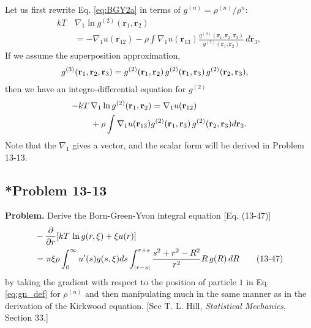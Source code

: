 \documentclass[twocolumn, 10pt]{article}
\numberwithin{equation}{section}
\newenvironment{problem}
{\par\medskip \color{problue}
  \textbf{Problem. }\ignorespaces}
{\medskip}
\newenvironment{solution}[1][\empty]
{\par\medskip\sffamily
  \textbf{\ifx\empty#1{Solution.}\relax\else{#1}\fi} \ignorespaces}
{\medskip}
\begin{document}
\begin{solution}
Let us first rewrite
Eq. \eqref{eq:BGY2a}
in terms of $g^{(n)} = \rho^{(n)}/\rho^n$:
\begin{align*}
kT \, & \nabla_1 \ln g^{(2)}(\mathbf r_1, \mathbf r_2)
\\
  &=
-\nabla_1 u(\mathbf r_{12})
-
\rho \int
\nabla_1 u(\mathbf r_{13})
  \frac{
    g^{(3)}(\mathbf r_1, \mathbf r_2, \mathbf r_{3})
  }{
    g^{(2)}(\mathbf r_1, \mathbf r_2)
  }
  \,
d\mathbf r_3
,
\end{align*}
%
If we assume the superposition approximation,
\begin{align}
  g^{(3)}(\mathbf r_1,\mathbf r_2,\mathbf r_3)
  &=
  g^{(2)}(\mathbf r_1,\mathbf r_2) \,
  g^{(2)}(\mathbf r_1,\mathbf r_3) \,
  g^{(2)}(\mathbf r_2,\mathbf r_3)
  ,
  \notag
\end{align}
then we have an integro-differential equation for $g^{(2)}$
\begin{align}
  -kT \, & \nabla_1 \ln g^{(2)}(\mathbf r_1, \mathbf r_2)
  =
  \nabla_1 u(\mathbf r_{12})
  \notag
  \\
  &+
  \rho
  \int
  \nabla_1 u(\mathbf r_{13})
    g^{(2)}(\mathbf r_1,\mathbf r_3) \,
    g^{(2)}(\mathbf r_2,\mathbf r_3)
    d\mathbf r_3
  .
  \label{eq:g2_BGYa}
\end{align}
Note that the $\nabla_1$ gives a vector,
and the scalar form will be derived in Problem 13-13.
\end{solution}

\subsection{*Problem 13-13}

\begin{problem}
  Derive the Born-Green-Yvon integral equation [Eq. (13-47)]
  \begin{align}
    &-\frac{\partial}{\partial r}
    [kT \, \ln g(r, \xi) + \xi u(r)]
    \notag
    \\
    &=
    \pi\xi\rho\int_0^\infty u'(s) g(s, \xi) ds
    \int_{|r-s|}^{r+s}
    \frac{ s^2 + r^2 - R^2 }{ r^2 }
    R \,  g(R) \, dR
    \tag{13-47}
  \end{align}
  by taking the gradient with respect to the position of particle $1$
  in Eq. \eqref{eq:gn_def}
  for $\rho^{(n)}$ and then manipulating much in the same manner
  as in the derivation of the Kirkwood equation.
  [See T. L. Hill, \textit{Statistical Mechanics}, Section 33.]
\end{problem}
\end{document}
